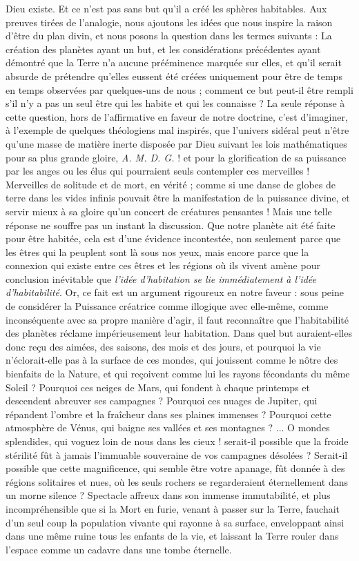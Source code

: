 \documentclass[a4paper, 11pt, oneside, landscape]{article}
\begin{document}
Dieu existe. Et ce n'est pas sans but qu'il a créé les sphères habitables. Aux preuves tirées de l'analogie, nous ajoutons les idées que nous inspire la raison d'être du plan divin, et nous posons la question dans les termes suivants : La création des planètes ayant un but, et les considérations précédentes ayant démontré que la Terre n'a aucune prééminence marquée sur elles, et qu'il serait absurde de prétendre qu'elles eussent été créées uniquement pour être de temps en temps observées par quelques-uns de nous ; comment ce but peut-il être rempli s'il n'y a pas un seul être qui les habite et qui les connaisse ? La seule réponse à cette question, hors de l'affirmative en faveur de notre doctrine, c'est d'imaginer, à l'exemple de quelques théologiens mal inspirés, que l'univers sidéral peut n'être qu'une masse de matière inerte disposée par Dieu suivant les lois mathématiques pour sa plus grande gloire, \emph{A. M. D. G.} ! et pour la glorification de sa puissance par les anges ou les élus qui pourraient seuls contempler ces merveilles ! Merveilles de solitude et de mort, en vérité ; comme si une danse de globes de terre dans les vides infinis pouvait être la manifestation de la puissance divine, et servir mieux à sa gloire qu'un concert de créatures pensantes ! Mais une telle réponse ne souffre pas un instant la discussion. Que notre planète ait été faite pour être habitée, cela est d'une évidence incontestée, non seulement parce que les êtres qui la peuplent sont là sous nos yeux, mais encore parce que la connexion qui existe entre ces êtres et les régions où ils vivent amène pour conclusion inévitable que \emph{l'idée d'habitation se lie immédiatement à l'idée d'habitabilité}. Or, ce fait est un argument rigoureux en notre faveur : sous peine de considérer la Puissance créatrice comme illogique avec elle-même, comme inconséquente avec sa propre manière d'agir, il faut reconnaître que l'habitabilité des planètes réclame impérieusement leur habitation. Dans quel but auraient-elles donc reçu des aimées, des saisons, des mois et des jours, et pourquoi la vie n'éclorait-elle pas à la surface de ces mondes, qui jouissent comme le nôtre des bienfaits de la Nature, et qui reçoivent comme lui les rayons fécondants du même Soleil ? Pourquoi ces neiges de Mars, qui fondent à chaque printemps et descendent abreuver ses campagnes ? Pourquoi ces nuages de Jupiter, qui répandent l'ombre et la fraîcheur dans ses plaines immenses ? Pourquoi cette atmosphère de Vénus, qui baigne ses vallées et ses montagnes ? ... O mondes splendides, qui voguez loin de nous dans les cieux ! serait-il possible que la froide stérilité fût à jamais l'immuable souveraine de vos campagnes désolées ? Serait-il possible que cette magnificence, qui semble être votre apanage, fût donnée à des régions solitaires et nues, où les seuls rochers se regarderaient éternellement dans un morne silence ? Spectacle affreux dans son immense immutabilité, et plus incompréhensible que si la Mort en furie, venant à passer sur la Terre, fauchait d'un seul coup la population vivante qui rayonne à sa surface, enveloppant ainsi dans une même ruine tous les enfants de la vie, et laissant la Terre rouler dans l'espace comme un cadavre dans une tombe éternelle.
\clearpage
\end{document}

